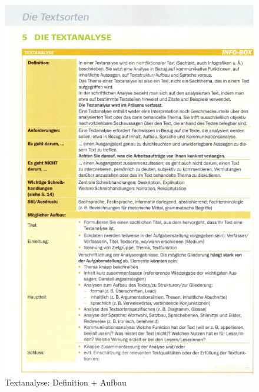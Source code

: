 \begin{figure}[h]
    \centering
    \includegraphics[scale=0.8]{pics/Screenshot from 2023-02-06 12-30-44.png}
    \caption{Textanalyse: Definition + Aufbau}
    \label{fig:impl:Textanalyse1}
\end{figure}

